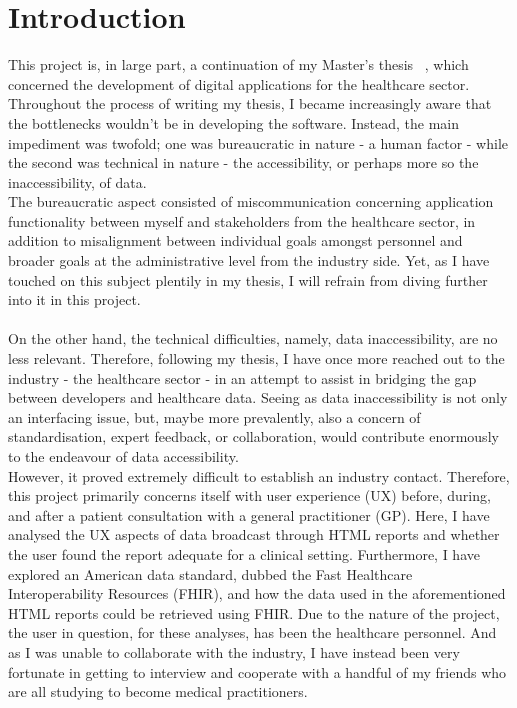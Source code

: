\section{Introduction}
This project is, in large part, a continuation of my Master's thesis ~\cite{thesis}, which concerned the development of digital applications for the healthcare sector. Throughout the process of writing my thesis, I became increasingly aware that the bottlenecks wouldn't be in developing the software. Instead, the main impediment was twofold; one was bureaucratic in nature - a human factor - while the second was technical in nature - the accessibility, or perhaps more so the inaccessibility, of data.
\\
The bureaucratic aspect consisted of miscommunication concerning application functionality between myself and stakeholders from the healthcare sector, in addition to misalignment between individual goals amongst personnel and broader goals at the administrative level from the industry side. Yet, as I have touched on this subject plentily in my thesis, I will refrain from diving further into it in this project. 
\\
\\
On the other hand, the technical difficulties, namely, data inaccessibility, are no less relevant. Therefore, following my thesis, I have once more reached out to the industry - the healthcare sector - in an attempt to assist in bridging the gap between developers and healthcare data. Seeing as data inaccessibility is not only an interfacing issue, but, maybe more prevalently, also a concern of standardisation, expert feedback, or collaboration, would contribute enormously to the endeavour of data accessibility.
\\
However, it proved extremely difficult to establish an industry contact. Therefore, this project primarily concerns itself with user experience (UX) before, during, and after a patient consultation with a general practitioner (GP). Here, I have analysed the UX aspects of data broadcast through HTML reports and whether the user found the report adequate for a clinical setting. Furthermore, I have explored an American data standard, dubbed the Fast Healthcare Interoperability Resources (FHIR), and how the data used in the aforementioned HTML reports could be retrieved using FHIR.
Due to the nature of the project, the user in question, for these analyses, has been the healthcare personnel. And as I was unable to collaborate with the industry, I have instead been very fortunate in getting to interview and cooperate with a handful of my friends who are all studying to become medical practitioners. 
